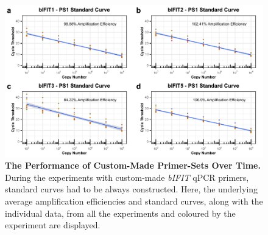 \begin{figure}
    \centering
    \includegraphics[width=1\linewidth]{07. Chapter 2/Figs/01. Technologies/03. standard curves behaviour.pdf}
    \caption[The Performance of Custom-Made Primer-Sets Over Time.]{\textbf{The Performance of Custom-Made Primer-Sets Over Time.} During the experiments with custom-made \textit{bIFIT} qPCR primers, standard curves had to be always constructed. Here, the underlying average amplification efficiencies and standard curves, along with the individual data, from all the experiments and coloured by the experiment are displayed.}
    \label{The Performance of Custom-Made Primer-Sets Over Time}
\end{figure}


















